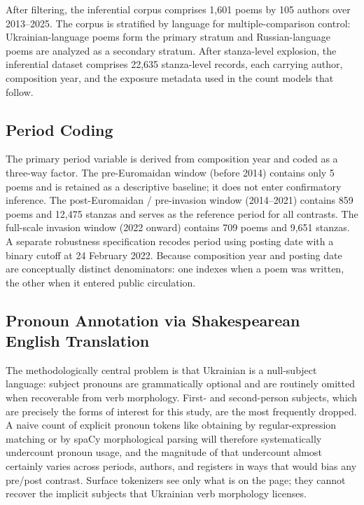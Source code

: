 \documentclass[12pt]{interact}
\theoremstyle{plain}%
\theoremstyle{definition}
\theoremstyle{remark}
\begin{document}
After filtering, the inferential corpus comprises 1{,}601 poems by 105 authors over 2013--2025. The corpus is stratified by language for multiple-comparison control: Ukrainian-language poems form the primary stratum and Russian-language poems are analyzed as a secondary stratum. After stanza-level explosion, the inferential dataset comprises 22{,}635 stanza-level records, each carrying author, composition year, and the exposure metadata used in the count models that follow.

\subsection{Period Coding}


The primary period variable is derived from composition year and coded as a three-way factor. The pre-Euromaidan window (before 2014) contains only 5 poems and is retained as a descriptive baseline; it does not enter confirmatory inference. The post-Euromaidan / pre-invasion window (2014–2021) contains 859 poems and 12,475 stanzas and serves as the reference period for all contrasts. The full-scale invasion window (2022 onward) contains 709 poems and 9,651 stanzas. A separate robustness specification recodes period using posting date with a binary cutoff at 24 February 2022. Because composition year and posting date are conceptually distinct denominators: one indexes when a poem was written, the other when it entered public circulation.

\subsection{Pronoun Annotation via Shakespearean English Translation}

The methodologically central problem is that Ukrainian is a null-subject language: subject pronouns are grammatically optional and are routinely omitted when recoverable from verb morphology. First- and second-person subjects, which are precisely the forms of interest for this study, are the most frequently dropped. A naive count of explicit pronoun tokens like obtaining by regular-expression matching or by spaCy morphological parsing will therefore systematically undercount pronoun usage, and the magnitude of that undercount almost certainly varies across periods, authors, and registers in ways that would bias any pre/post contrast. Surface tokenizers see only what is on the page; they cannot recover the implicit subjects that Ukrainian verb morphology licenses.
\end{document}
